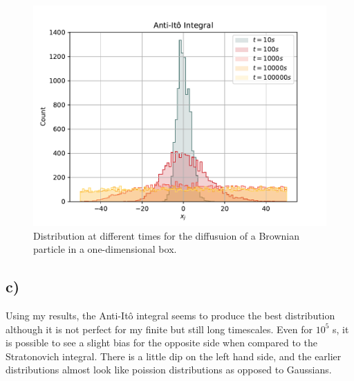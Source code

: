 \documentclass[a4paper, 12pt]{article}
\begin{document}
\begin{figure}[h!]
    \centering
    \includegraphics[width=0.8\linewidth]{../Spurious-Drift/anti-ito.pdf}
    \caption{Distribution at different times for the diffusuion of a Brownian particle in a one-dimensional box.}
    \label{fig:antiito}
\end{figure}

\newpage

\subsection*{c)}
Using my results, the Anti-Itô integral seems to produce the best distribution although it is not perfect for my finite but still long timescales. Even for $10^5$ s, it is possible to see a slight bias for the opposite side when compared to the Stratonovich integral. There is a little dip on the left hand side, and the earlier distributions almost look like poission distributions as opposed to Gaussians.
\end{document}
